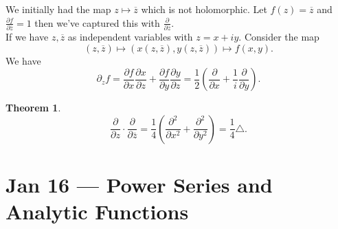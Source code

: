\documentclass[a4paper]{article}
\newtheorem{thm}{Theorem}[section]
\begin{document}
\noindent We initially had the map $z\mapsto \overline{z}$ which is not holomorphic. Let $f(z)=\overline{z}$ and $\frac{\partial f}{\partial \overline{z}}=1$ then we've captured this with $\frac{\partial}{\partial \overline{z}}.$\\
If we have $z,\overline{z}$ as independent variables with $z=x+iy$. Consider the map 
\[
(z,\overline{z})\mapsto (x(z,\overline{z}), y(z,\overline{z}))\mapsto f(x,y)
.\]
We have \[
\partial_z f = \frac{\partial f}{\partial x}\frac{\partial x}{\partial z}+\frac{\partial f}{\partial y} \frac{\partial y}{\partial z}=\frac{1}{2} \left( \frac{\partial}{\partial x}+\frac{1}{i}\frac{\partial}{\partial y} \right)
.\]
\begin{thm}
    \[
    \frac{\partial}{\partial z}\cdot \frac{\partial}{\partial \overline z}=\frac{1}{4} \left( \frac{\partial^2}{\partial x^2}+\frac{\partial^2}{\partial y^2} \right)=\frac{1}{4}\triangle
    .\]
\end{thm}

\newpage
\section{Jan 16 --- Power Series and Analytic Functions}
\end{document}
